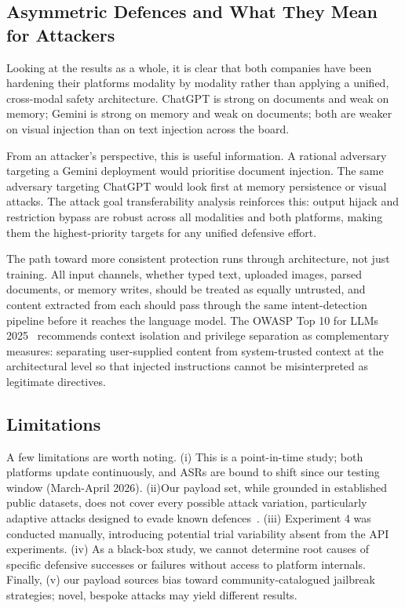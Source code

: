 \documentclass[conference]{IEEEtran}
\begin{document}
\subsection{Asymmetric Defences and What They Mean for Attackers}

Looking at the results as a whole, it is clear that both companies have been hardening their platforms modality by modality rather than applying a unified, cross-modal safety architecture. ChatGPT is strong on documents and weak on memory; Gemini is strong on memory and weak on documents; both are weaker on visual injection than on text injection across the board.

From an attacker's perspective, this is useful information. A rational adversary targeting a Gemini deployment would prioritise document injection. The same adversary targeting ChatGPT would look first at memory persistence or visual attacks. The attack goal transferability analysis reinforces this: output hijack and restriction bypass are robust across all modalities and both platforms, making them the highest-priority targets for any unified defensive effort.

The path toward more consistent protection runs through architecture, not just training. All input channels, whether typed text, uploaded images, parsed documents, or memory writes, should be treated as equally untrusted, and content extracted from each should pass through the same intent-detection pipeline before it reaches the language model. The OWASP Top 10 for LLMs 2025~\cite{owasp2025llm} recommends context isolation and privilege separation as complementary measures: separating user-supplied content from system-trusted context at the architectural level so that injected instructions cannot be misinterpreted as legitimate directives.

\subsection{Limitations}

A few limitations are worth noting. (i) This is a point-in-time study; both platforms update continuously, and ASRs are bound to shift since our testing window (March-April 2026). (ii)Our payload set, while grounded in established public datasets, does not cover every possible attack variation, particularly adaptive attacks designed to evade known defences~\cite{ni2025crossmodal}. (iii) Experiment 4 was conducted manually, introducing potential trial variability absent from the API experiments. (iv) As a black-box study, we cannot determine root causes of specific defensive successes or failures without access to platform internals. Finally, (v) our payload sources bias toward community-catalogued jailbreak strategies; novel, bespoke attacks may yield different results.
\end{document}
